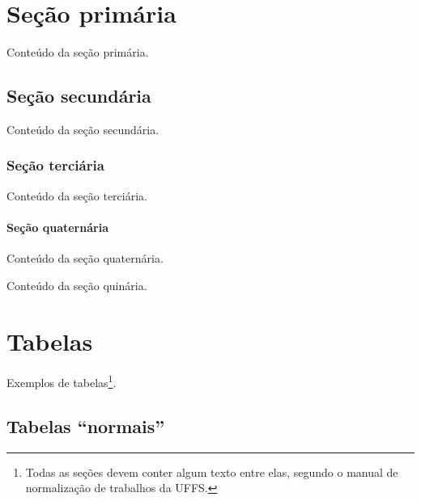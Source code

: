 \documentclass[serif]{uffstex}
\begin{document}
\pretextual

\imprimircapa

\imprimirfolhaderosto

\tableofcontents*
\clearpage

\textual

\chapter{Seção primária}

Conteúdo da seção primária.

\section{Seção secundária}

Conteúdo da seção secundária.

\subsection{Seção terciária}

Conteúdo da seção terciária.

\subsubsection{Seção quaternária}

Conteúdo da seção quaternária.


Conteúdo da seção quinária.

\newpage

\chapter{Tabelas}

Exemplos de tabelas\footnote{Todas as seções devem conter algum texto entre elas, segundo o manual de normalização de trabalhos da UFFS.}.

\section{Tabelas \enquote{normais}}
\end{document}
